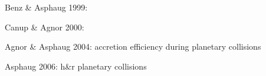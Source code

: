 



\cite{Benz:1988p3336}

\cite{Benz1999Icar..142....5B}
Benz \& Asphaug 1999:

\cite{Canup:2000p3542}
Canup \& Agnor 2000:
	
\cite{Agnor:2004p3329}
Agnor \& Asphaug 2004: accretion efficiency during planetary collisions

\cite{Asphaug:2006p3729}
Asphaug 2006: h\&r planetary collisions

